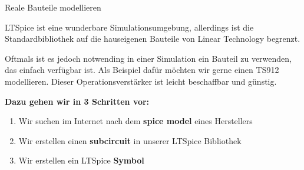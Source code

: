 \begin{frame}[t]{Reale Bauteile modellieren} 

    LTSpice ist eine wunderbare Simulationsumgebung, allerdings ist die Standardbibliothek
    auf die hauseigenen Bauteile von Linear Technology begrenzt.

    Oftmals ist es jedoch notwending in einer Simulation ein Bauteil zu verwenden, 
    das einfach verfügbar ist. Als Beispiel dafür möchten wir gerne einen TS912 modellieren.
    Dieser Operationsverstärker ist leicht beschaffbar und günstig.

    \textbf{Dazu gehen wir in 3 Schritten vor:}

    \begin{enumerate}
        \item Wir suchen im Internet nach dem \textbf{spice model} eines Herstellers
        \item Wir erstellen einen \textbf{subcircuit} in unserer LTSpice Bibliothek
        \item Wir erstellen ein LTSpice \textbf{Symbol} 
    \end{enumerate}
\end{frame}

